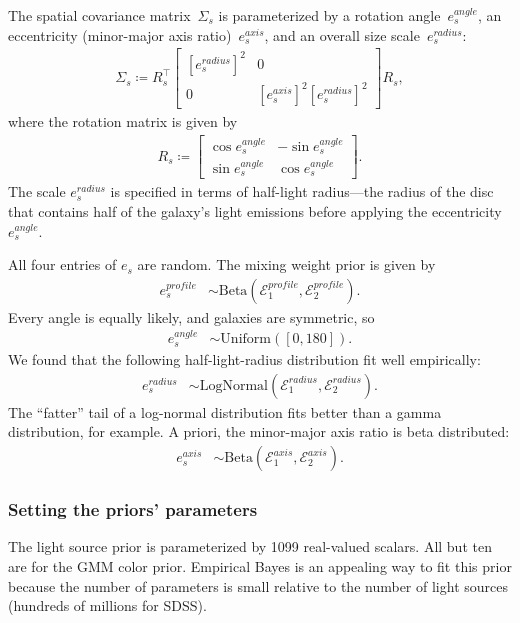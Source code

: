 The spatial covariance matrix~$\Sigma_s$ is parameterized by a rotation angle~$e_s^{angle}$, an eccentricity (minor-major axis ratio)~$e_{s}^{axis}$, and an
overall size scale~$e_{s}^{radius}$:
\begin{align}
\Sigma_s \coloneqq R_s^{\top}\begin{bmatrix} [ e_{s}^{radius}]^{2} & 0\\
                            0 & [e_{s}^{axis}]^2[e_{s}^{radius}]^{2}
\end{bmatrix} R_s,
\end{align}
where the rotation matrix is given by
\begin{align}
R_s \coloneqq \begin{bmatrix}\cos e_s^{angle} & -\sin e_s^{angle}\\
                           \sin e_s^{angle} & \cos e_s^{angle}
\end{bmatrix}.
\end{align}
The scale $e_{s}^{radius}$ is specified in terms of half-light radius---the
radius of the disc that contains half of the galaxy's light emissions
before applying the eccentricity $e_s^{angle}$.

All four entries of $e_s$ are random.
The mixing weight prior is given by
\begin{align}
e_s^{profile} &\sim \mathrm{Beta}(\mathcal E^{profile}_1, \mathcal E^{profile}_2).
\end{align}
Every angle is equally likely, and galaxies are symmetric, so
\begin{align}
e_s^{angle} &\sim \mathrm{Uniform}([0, 180]).
\end{align}
We found that the following half-light-radius distribution fit well empirically:
\begin{align}
e_s^{radius} &\sim \mathrm{LogNormal}(\mathcal E^{radius}_1, \mathcal E^{radius}_2).
\end{align}
The ``fatter'' tail of a log-normal distribution fits better than a gamma distribution, for example.
A priori, the minor-major axis ratio is beta distributed:
\begin{align}
e_s^{axis} &\sim \mathrm{Beta}(\mathcal E^{axis}_1, \mathcal E^{axis}_2).
\end{align}


\subsubsection{Setting the priors' parameters}
\label{prior}
The light source prior is parameterized by 1099 real-valued scalars.
All but ten are for the GMM color prior.
Empirical Bayes is an appealing way to fit this prior because the number of parameters is small relative to the number of light sources (hundreds of millions for SDSS).

